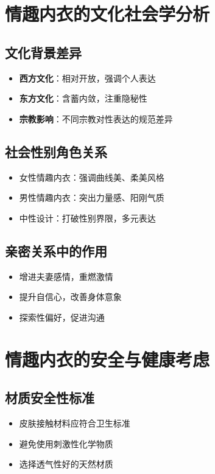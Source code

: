 \documentclass[12pt,UTF8]{ctexbook}
\begin{document}
\section{情趣内衣的文化社会学分析}
\subsection{文化背景差异}
\begin{itemize}[leftmargin=2cm]
	\item \textbf{西方文化}：相对开放，强调个人表达
	\item \textbf{东方文化}：含蓄内敛，注重隐秘性
	\item \textbf{宗教影响}：不同宗教对性表达的规范差异
\end{itemize}

\subsection{社会性别角色关系}
\begin{itemize}[leftmargin=2cm]
	\item 女性情趣内衣：强调曲线美、柔美风格
	\item 男性情趣内衣：突出力量感、阳刚气质
	\item 中性设计：打破性别界限，多元表达
\end{itemize}

\subsection{亲密关系中的作用}
\begin{itemize}[leftmargin=2cm]
	\item 增进夫妻感情，重燃激情
	\item 提升自信心，改善身体意象
	\item 探索性偏好，促进沟通
\end{itemize}

\section{情趣内衣的安全与健康考虑}
\subsection{材质安全性标准}
\begin{itemize}[leftmargin=2cm]
	\item 皮肤接触材料应符合卫生标准
	\item 避免使用刺激性化学物质
	\item 选择透气性好的天然材质
\end{itemize}
\end{document}
